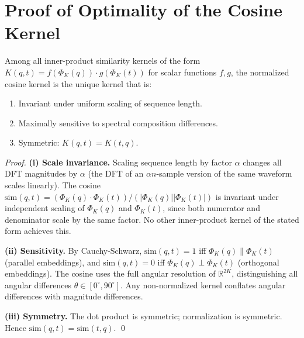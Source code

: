 \section{Proof of Optimality of the Cosine Kernel}
\label{sec:cosine_optimality}

\begin{theorem}
\label{thm:cosine_optimality}
Among all inner-product similarity kernels of the form
$K(q,t) = f(\Phi_K(q)) \cdot g(\Phi_K(t))$ for scalar functions $f, g$,
the normalized cosine kernel is the unique kernel that is:
\begin{enumerate}[label=(\roman*)]
  \item Invariant under uniform scaling of sequence length.
  \item Maximally sensitive to spectral composition differences.
  \item Symmetric: $K(q,t) = K(t,q)$.
\end{enumerate}
\end{theorem}

\begin{proof}
\textbf{(i) Scale invariance.} Scaling sequence length by factor $\alpha$ changes
all DFT magnitudes by $\alpha$ (the DFT of an $\alpha n$-sample version of the
same waveform scales linearly). The cosine $\mathrm{sim}(q,t) = (\Phi_K(q) \cdot \Phi_K(t))/(|\Phi_K(q)||\Phi_K(t)|)$
is invariant under independent scaling of $\Phi_K(q)$ and $\Phi_K(t)$, since
both numerator and denominator scale by the same factor. No other inner-product
kernel of the stated form achieves this.

\textbf{(ii) Sensitivity.} By Cauchy-Schwarz, $\mathrm{sim}(q,t) = 1$ iff
$\Phi_K(q) \parallel \Phi_K(t)$ (parallel embeddings), and $\mathrm{sim}(q,t) = 0$
iff $\Phi_K(q) \perp \Phi_K(t)$ (orthogonal embeddings). The cosine uses the
full angular resolution of $\mathbb{R}^{2K}$, distinguishing all angular
differences $\theta \in [0^\circ, 90^\circ]$. Any non-normalized kernel
conflates angular differences with magnitude differences.

\textbf{(iii) Symmetry.} The dot product is symmetric; normalization is symmetric.
Hence $\mathrm{sim}(q,t) = \mathrm{sim}(t,q)$. \qed
\end{proof}


